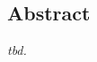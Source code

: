 
\vspace{0.5cm}

\begin{center}
  \begin{minipage}{0.8\textwidth}

    \section*{Abstract}
    \label{section:abstract}

    \textit{tbd.}

  \end{minipage}
\end{center}

\newpage
